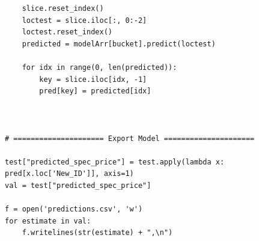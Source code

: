 \documentclass{article}
\begin{document}
\begin{lstlisting}
    slice.reset_index()
    loctest = slice.iloc[:, 0:-2]
    loctest.reset_index()
    predicted = modelArr[bucket].predict(loctest)

    for idx in range(0, len(predicted)):
        key = slice.iloc[idx, -1]
        pred[key] = predicted[idx]



# ===================== Export Model =====================

test["predicted_spec_price"] = test.apply(lambda x: pred[x.loc['New_ID']], axis=1)
val = test["predicted_spec_price"]

f = open('predictions.csv', 'w')
for estimate in val:
    f.writelines(str(estimate) + ",\n")

\end{lstlisting}
\end{document}
